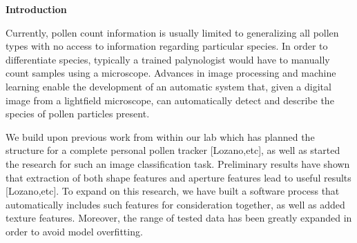 \textbf{Introduction}
     
     Currently, pollen count information is usually limited to generalizing all pollen types with no access to information regarding particular species. In order to differentiate species, typically a trained palynologist would have to manually count samples using a microscope. Advances in image processing and machine learning enable the development of an automatic system that, given a digital image from a lightfield microscope, can automatically detect and describe the species of pollen particles present. 
     
We build upon previous work from within our lab which has planned the structure for a complete personal pollen tracker [Lozano,etc], as well as started the research for such an image classification task. Preliminary results have shown that extraction of both shape features and aperture features lead to useful results [Lozano,etc]. To expand on this research, we have built a software process that automatically includes such features for consideration together, as well as added texture features. Moreover, the range of tested data has been greatly expanded in order to avoid model overfitting. 

    
  
